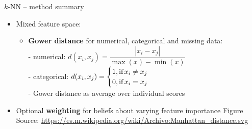 \begin{frame2}{$k$-NN -- method summary}
\begin{itemize}
  \item Mixed feature space: 
  \begin{itemize}
      \item \textbf{Gower distance} for numerical, categorical and missing data:\\ %
            - numerical: $d(x_i,x_j) =  \dfrac{|x_i-x_j|}{\max(x)-\min(x)}$\\
            - categorical: $d(x_i,x_j) =
            \begin{cases}
              1, \text{if\,} x_i \neq x_j\\
              0, \text{if\,} x_i = x_j
            \end{cases}$\\
            - Gower distance as average over individual scores
  \end{itemize}
  \item Optional \textbf{weighting} for beliefs about varying feature
  importance
  \vfill
    {\small Figure Source: \href{https://es.m.wikipedia.org/wiki/Archivo:Manhattan_distance.svg}{https://es.m.wikipedia.org/wiki/Archivo:Manhattan\_distance.svg}}

\end{itemize}
\vfill
  

\end{frame2}

